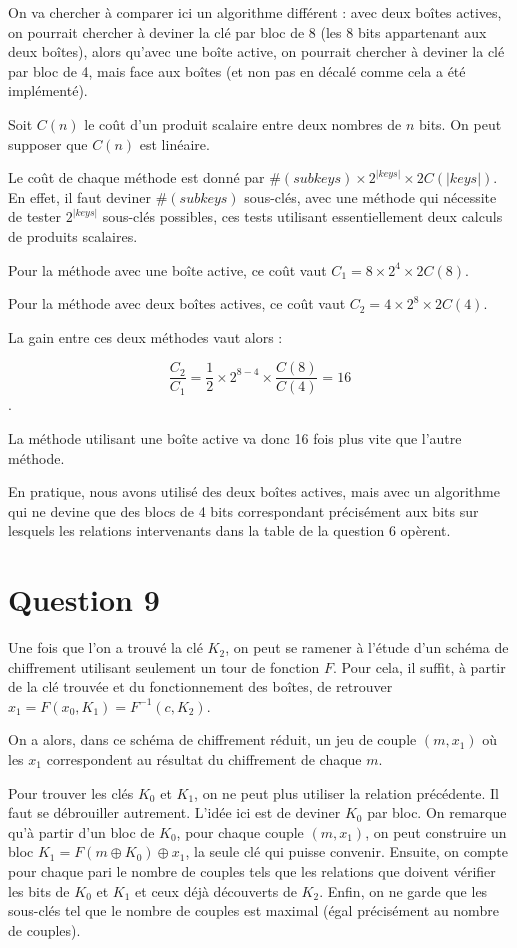 On va chercher à comparer ici un algorithme différent : avec deux boîtes actives, on pourrait chercher à deviner la clé par bloc de 8 (les 8 bits appartenant aux deux boîtes), alors qu'avec une boîte active, on pourrait chercher à deviner la clé par bloc de 4, mais face aux boîtes (et non pas en décalé comme cela a été implémenté).

Soit $C(n)$ le coût d'un produit scalaire entre deux nombres de $n$ bits. On peut supposer que $C(n)$ est linéaire.

Le coût de chaque méthode est donné par $ \# (subkeys) \times 2^{ | keys |} \times 2 C( |keys|)$. En effet, il faut deviner $\# (subkeys)$ sous-clés, avec une méthode qui nécessite de tester $2^{ | keys |}$ sous-clés possibles, ces tests utilisant essentiellement deux calculs de produits scalaires.

Pour la méthode avec une boîte active, ce coût vaut $C_1 = 8 \times 2^4 \times 2 C(8)$. 

Pour la méthode avec deux boîtes actives, ce coût vaut $C_2 = 4 \times 2^8 \times 2 C(4)$.

La gain entre ces deux méthodes vaut alors :

$$ \frac{C_2}{C_1} = \frac{1}{2} \times 2^{8-4} \times \frac{C(8)}{C(4)} = 16$$.

La méthode utilisant une boîte active va donc 16 fois plus vite que l'autre méthode.

En pratique, nous avons utilisé des deux boîtes actives, mais avec un algorithme qui ne devine que des blocs de 4 bits correspondant précisément aux bits sur lesquels les relations intervenants dans la table de la question 6 opèrent.

\section*{Question 9}

Une fois que l'on a trouvé la clé $K_2$, on peut se ramener à l'étude d'un schéma de chiffrement utilisant seulement un tour de fonction $F$. Pour cela, il suffit, à partir de la clé trouvée et du fonctionnement des boîtes, de retrouver $x_1 = F(x_0,K_1) = F^{-1}(c,K_2)$.

On a alors, dans ce schéma de chiffrement réduit, un jeu de couple $(m,x_1)$ où les $x_1$ correspondent au résultat du chiffrement de chaque $m$.

Pour trouver les clés $K_0$ et $K_1$, on ne peut plus utiliser la relation précédente. Il faut se débrouiller autrement. L'idée ici est de deviner $K_0$ par bloc. On remarque qu'à partir d'un bloc de $K_0$, pour chaque couple $(m,x_1)$, on peut construire un bloc $K_1 = F(m \oplus K_0) \oplus x_1$, la seule clé qui puisse convenir. Ensuite, on compte pour chaque pari le nombre de couples tels que les relations que doivent vérifier les bits de $K_0$ et $K_1$ et ceux déjà découverts de $K_2$. Enfin, on ne garde que les sous-clés tel que le nombre de couples est maximal (égal précisément au nombre de couples).	

